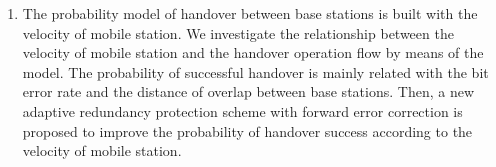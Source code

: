 {\begin{enumerate}[(1)]
    \item The probability model of handover between base stations is built with the velocity of mobile station. We investigate the relationship between the velocity of mobile station and the handover operation flow by means of the model. The probability of successful handover is mainly related with the bit error rate and the distance of overlap between base stations. Then, a new adaptive  redundancy protection scheme with forward error correction is proposed to improve the probability of handover success according to the velocity of mobile station.
\end{enumerate}

}

